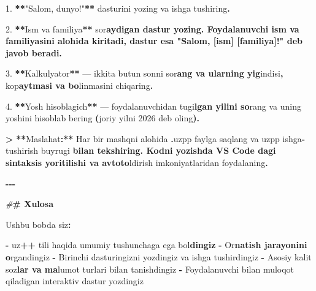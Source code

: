 \documentclass[a4paper,11pt,twoside,openright]{book}
\newenvironment{Shaded}{\begin{snugshade}}{\end{snugshade}}
\newcommand{\CharTok}[1]{\textcolor[rgb]{0.31,0.60,0.02}{#1}}
\newcommand{\DecValTok}[1]{\textcolor[rgb]{0.00,0.00,0.81}{#1}}
\newcommand{\ErrorTok}[1]{\textcolor[rgb]{0.64,0.00,0.00}{\textbf{#1}}}
\newcommand{\FloatTok}[1]{\textcolor[rgb]{0.00,0.00,0.81}{#1}}
\newcommand{\NormalTok}[1]{#1}
\newcommand{\OperatorTok}[1]{\textcolor[rgb]{0.81,0.36,0.00}{\textbf{#1}}}
\newcommand{\PreprocessorTok}[1]{\textcolor[rgb]{0.56,0.35,0.01}{\textit{#1}}}
\newcommand{\StringTok}[1]{\textcolor[rgb]{0.31,0.60,0.02}{#1}}
\begin{document}
\begin{Shaded}
\begin{Highlighting}[]
\FloatTok{1.} \OperatorTok{**}\StringTok{"Salom, dunyo!"}\OperatorTok{**}\NormalTok{ dasturini yozing va ishga tushiring}\OperatorTok{.}

\FloatTok{2.} \OperatorTok{**}\NormalTok{Ism va familiya}\OperatorTok{**}\NormalTok{ so}\CharTok{\textquotesingle{}r}\ErrorTok{aydigan dastur yozing. Foydalanuvchi ism va familiyasini alohida kiritadi, dastur esa "Salom, [ism] [familiya]!" deb javob beradi.}

\FloatTok{3.} \OperatorTok{**}\NormalTok{Kalkulyator}\OperatorTok{**}\NormalTok{ — ikkita butun sonni so}\CharTok{\textquotesingle{}r}\ErrorTok{ang va ularning yig}\CharTok{\textquotesingle{}}\NormalTok{indisi}\OperatorTok{,}\NormalTok{ ko}\CharTok{\textquotesingle{}p}\ErrorTok{aytmasi va bo}\CharTok{\textquotesingle{}}\NormalTok{linmasini chiqaring}\OperatorTok{.}

\FloatTok{4.} \OperatorTok{**}\NormalTok{Yosh hisoblagich}\OperatorTok{**}\NormalTok{ — foydalanuvchidan tug}\CharTok{\textquotesingle{}i}\ErrorTok{lgan yilini so}\CharTok{\textquotesingle{}}\NormalTok{rang va uning yoshini hisoblab bering }\OperatorTok{(}\NormalTok{joriy yilni }\DecValTok{2026}\NormalTok{ deb oling}\OperatorTok{).}

\OperatorTok{\textgreater{}} \OperatorTok{**}\NormalTok{Maslahat}\OperatorTok{:**}\NormalTok{ Har bir mashqni alohida }\ErrorTok{\textasciigrave{}}\OperatorTok{.}\NormalTok{uzpp}\ErrorTok{\textasciigrave{}}\NormalTok{ faylga saqlang va }\ErrorTok{\textasciigrave{}}\NormalTok{uzpp ishga}\OperatorTok{{-}}\NormalTok{tushirish}\ErrorTok{\textasciigrave{}}\NormalTok{ buyrug}\CharTok{\textquotesingle{}i}\ErrorTok{ bilan tekshiring. Kodni yozishda VS Code dagi sintaksis yoritilishi va avtoto}\CharTok{\textquotesingle{}}\NormalTok{ldirish imkoniyatlaridan foydalaning}\OperatorTok{.}

\OperatorTok{{-}{-}{-}}

\PreprocessorTok{\#}\ErrorTok{\# Xulosa}

\NormalTok{Ushbu bobda siz}\OperatorTok{:}

\OperatorTok{{-}}\NormalTok{ uz}\OperatorTok{++}\NormalTok{ tili haqida umumiy tushunchaga ega bo}\CharTok{\textquotesingle{}l}\ErrorTok{dingiz}
\OperatorTok{{-}}\NormalTok{ O}\CharTok{\textquotesingle{}r}\ErrorTok{natish jarayonini o}\CharTok{\textquotesingle{}}\NormalTok{rgandingiz}
\OperatorTok{{-}}\NormalTok{ Birinchi dasturingizni yozdingiz va ishga tushirdingiz}
\OperatorTok{{-}}\NormalTok{ Asosiy kalit so}\CharTok{\textquotesingle{}z}\ErrorTok{lar va ma}\CharTok{\textquotesingle{}}\NormalTok{lumot turlari bilan tanishdingiz}
\OperatorTok{{-}}\NormalTok{ Foydalanuvchi bilan muloqot qiladigan interaktiv dastur yozdingiz}


\end{Highlighting}
\end{Shaded}
\end{document}
